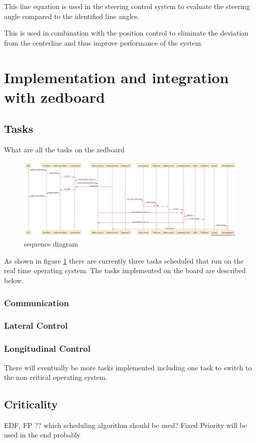 This line equation is used in the steering control system to evaluate the steering angle compared to the identified line angles.

This is used in combination with the position control to eliminate the deviation from the centerline and thus improve performance of the system.

\section{Implementation and integration with zedboard}
\subsection{Tasks}
What are all the tasks on the zedboard

\begin{figure}[H]
  \includegraphics[width=\textwidth]{./img/sekvensdiagram.png}
  \centering
  \caption{sequence diagram}
  \label{fig:sequence diagram}
\end{figure}
 As shown in figure \ref{fig:sequence diagram} there are currently three tasks scheduled that run on the real time operating system. The tasks implemented on the board are described below.
 
\subsubsection{Communication}
\subsubsection{Lateral Control}
\subsubsection{Longitudinal Control} 
 
 
There will eventually be more tasks implemented including one task to switch to the non critical operating system.

\subsection{Criticality}
EDF, FP ?? which scheduling algorithm should be used? Fixed Priority will be used in the end probably

